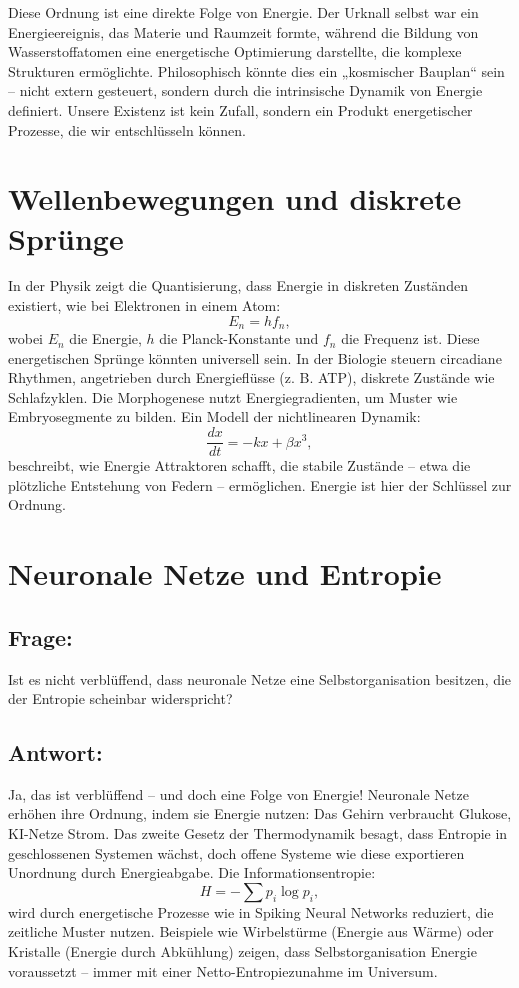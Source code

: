 \documentclass{article}
\begin{document}
	Diese Ordnung ist eine direkte Folge von Energie. Der Urknall selbst war ein Energieereignis, das Materie und Raumzeit formte, während die Bildung von Wasserstoffatomen eine energetische Optimierung darstellte, die komplexe Strukturen ermöglichte. Philosophisch könnte dies ein „kosmischer Bauplan“ sein – nicht extern gesteuert, sondern durch die intrinsische Dynamik von Energie definiert. Unsere Existenz ist kein Zufall, sondern ein Produkt energetischer Prozesse, die wir entschlüsseln können.
	
	\section{Wellenbewegungen und diskrete Sprünge}
	In der Physik zeigt die Quantisierung, dass Energie in diskreten Zuständen existiert, wie bei Elektronen in einem Atom:
	\begin{equation}
		E_n = h f_n,
	\end{equation}
	wobei $E_n$ die Energie, $h$ die Planck-Konstante und $f_n$ die Frequenz ist. Diese energetischen Sprünge könnten universell sein. In der Biologie steuern circadiane Rhythmen, angetrieben durch Energieflüsse (z. B. ATP), diskrete Zustände wie Schlafzyklen. Die Morphogenese nutzt Energiegradienten, um Muster wie Embryosegmente zu bilden. Ein Modell der nichtlinearen Dynamik:
	\begin{equation}
		\frac{dx}{dt} = -kx + \beta x^3,
	\end{equation}
	beschreibt, wie Energie Attraktoren schafft, die stabile Zustände – etwa die plötzliche Entstehung von Federn – ermöglichen. Energie ist hier der Schlüssel zur Ordnung.
	
	\section{Neuronale Netze und Entropie}
	
	\subsection*{Frage:}
	Ist es nicht verblüffend, dass neuronale Netze eine Selbstorganisation besitzen, die der Entropie scheinbar widerspricht?
	
	\subsection*{Antwort:}
	Ja, das ist verblüffend – und doch eine Folge von Energie! Neuronale Netze erhöhen ihre Ordnung, indem sie Energie nutzen: Das Gehirn verbraucht Glukose, KI-Netze Strom. Das zweite Gesetz der Thermodynamik besagt, dass Entropie in geschlossenen Systemen wächst, doch offene Systeme wie diese exportieren Unordnung durch Energieabgabe. Die Informationsentropie:
	\begin{equation}
		H = -\sum p_i \log p_i,
	\end{equation}
	wird durch energetische Prozesse wie in Spiking Neural Networks reduziert, die zeitliche Muster nutzen. Beispiele wie Wirbelstürme (Energie aus Wärme) oder Kristalle (Energie durch Abkühlung) zeigen, dass Selbstorganisation Energie voraussetzt – immer mit einer Netto-Entropiezunahme im Universum.
	
\end{document}
